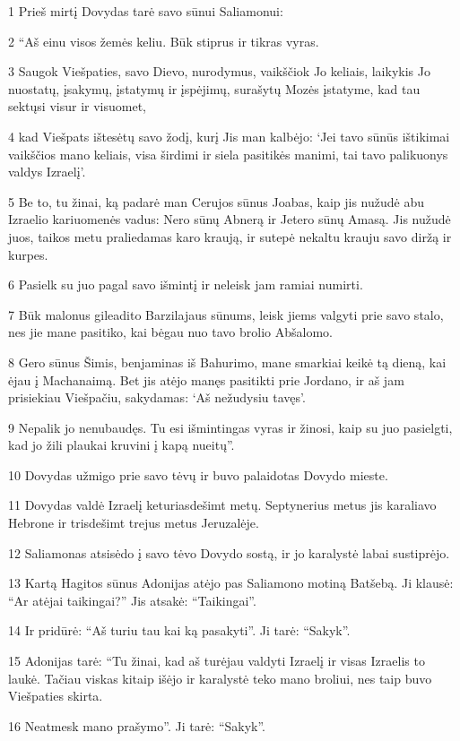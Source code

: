 \par 1 Prieš mirtį Dovydas tarė savo sūnui Saliamonui: 
\par 2 “Aš einu visos žemės keliu. Būk stiprus ir tikras vyras. 
\par 3 Saugok Viešpaties, savo Dievo, nurodymus, vaikščiok Jo keliais, laikykis Jo nuostatų, įsakymų, įstatymų ir įspėjimų, surašytų Mozės įstatyme, kad tau sektųsi visur ir visuomet, 
\par 4 kad Viešpats ištesėtų savo žodį, kurį Jis man kalbėjo: ‘Jei tavo sūnūs ištikimai vaikščios mano keliais, visa širdimi ir siela pasitikės manimi, tai tavo palikuonys valdys Izraelį’. 
\par 5 Be to, tu žinai, ką padarė man Cerujos sūnus Joabas, kaip jis nužudė abu Izraelio kariuomenės vadus: Nero sūnų Abnerą ir Jetero sūnų Amasą. Jis nužudė juos, taikos metu praliedamas karo kraują, ir sutepė nekaltu krauju savo diržą ir kurpes. 
\par 6 Pasielk su juo pagal savo išmintį ir neleisk jam ramiai numirti. 
\par 7 Būk malonus gileadito Barzilajaus sūnums, leisk jiems valgyti prie savo stalo, nes jie mane pasitiko, kai bėgau nuo tavo brolio Abšalomo. 
\par 8 Gero sūnus Šimis, benjaminas iš Bahurimo, mane smarkiai keikė tą dieną, kai ėjau į Machanaimą. Bet jis atėjo manęs pasitikti prie Jordano, ir aš jam prisiekiau Viešpačiu, sakydamas: ‘Aš nežudysiu tavęs’. 
\par 9 Nepalik jo nenubaudęs. Tu esi išmintingas vyras ir žinosi, kaip su juo pasielgti, kad jo žili plaukai kruvini į kapą nueitų”. 
\par 10 Dovydas užmigo prie savo tėvų ir buvo palaidotas Dovydo mieste. 
\par 11 Dovydas valdė Izraelį keturiasdešimt metų. Septynerius metus jis karaliavo Hebrone ir trisdešimt trejus metus Jeruzalėje. 
\par 12 Saliamonas atsisėdo į savo tėvo Dovydo sostą, ir jo karalystė labai sustiprėjo. 
\par 13 Kartą Hagitos sūnus Adonijas atėjo pas Saliamono motiną Batšebą. Ji klausė: “Ar atėjai taikingai?” Jis atsakė: “Taikingai”. 
\par 14 Ir pridūrė: “Aš turiu tau kai ką pasakyti”. Ji tarė: “Sakyk”. 
\par 15 Adonijas tarė: “Tu žinai, kad aš turėjau valdyti Izraelį ir visas Izraelis to laukė. Tačiau viskas kitaip išėjo ir karalystė teko mano broliui, nes taip buvo Viešpaties skirta. 
\par 16 Neatmesk mano prašymo”. Ji tarė: “Sakyk”. 
